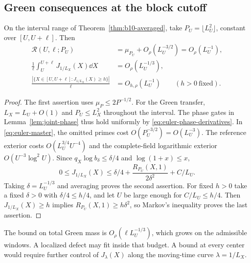 \subsection{Green consequences at the block cutoff}
\begin{corollary}\label{cor:b10-green}
On the interval range of Theorem~\ref{thm:b10-averaged}, take
\(P_U=\lfloor L_U^2\rfloor\), constant over \([U,U+\ell]\).
Then
\begin{align*}
 \mathscr R(U,\ell;P_U)&=\mu_{P_U}+O_\rho(L_U^{-3/2})
                                    =O_\rho(L_U^{-1}),\\
 \frac1\ell\int_U^{U+\ell}J_{1/L_X}(X)\dd X
   &=O_\rho(L_U^{-1/3}),\\
 \frac{|\{X\in[U,U+\ell]:J_{1/L_X}(X)\ge h\}|}{\ell}
   &=O_{h,\rho}(L_U^{-1})\qquad(h>0\ \text{fixed}).
\end{align*}
\end{corollary}
\begin{proof}
The first assertion uses \(\mu_P\le2P^{-1/2}\).
For the Green transfer, \(L_X=L_U+O(1)\) and \(P_U\le L_X^2\)
throughout the interval. The phase gates in
Lemma~\ref{lem:joint-phase} thus hold uniformly by
\eqref{eq:euler-phase-derivatives}. In \eqref{eq:euler-master},
the omitted primes cost \(O(P_U^{-3/2})=O(L_U^{-3})\).
The reference exterior costs \(O(L_U^{3/4}U^{-4})\) and the
complete-field logarithmic exterior \(O(U^{-3}\log^2U)\).
Since \(q_X\log b_\delta\le\delta/4\) and \(\log(1+x)\le x\),
\[
 0\le J_{1/L_X}(X)\le
     \delta/4+\frac{R_{P_U}(X,1)}{2\delta^2}+C/L_U .
\]
Taking \(\delta=L_U^{-1/3}\) and averaging proves the second
assertion. For fixed \(h>0\) take a fixed \(\delta>0\) with
\(\delta/4\le h/4\), and let \(U\) be large enough for
\(C/L_U\le h/4\). Then \(J_{1/L_X}(X)\ge h\) implies
\(R_{P_U}(X,1)\ge h\delta^2\), so Markov's inequality proves
the last assertion.
\end{proof}

The bound on total Green mass is \(O_\rho(\ell L_U^{-1/3})\),
which grows on the admissible windows. A localized defect may fit inside that
budget. A bound at every center would require further control
of \(J_\lambda(X)\) along the moving-time curve
\(\lambda=1/L_X\).
